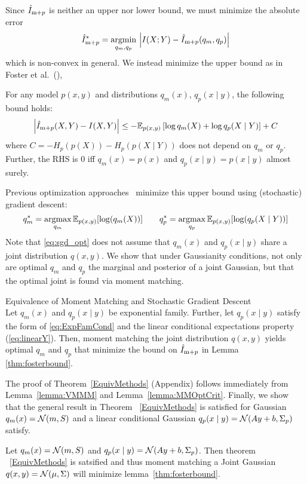 Since $\hat{I}_{\text{m}+p}$ is neither an upper nor lower bound, we must minimize the
absolute error
\begin{equation}\label{eq:mi_ml_opt}
  \hat{I}_{\text{m}+p}^* = \operatorname*{argmin}_{q_m, q_p} \, \left| I(X;Y) - \hat{I}_{\text{m}+p}(q_m, q_p) \right|
\end{equation}
which is non-convex in general.  We instead minimize the upper bound
as in Foster et al.~(\citeyear{Foster2019}),
\begin{lemma}
  \label{thm:fosterbound} For any model $p(x,y)$ and distributions
  $q_m(x)$, $q_p(x\mid y)$, the following bound holds:
  {\fontsize{9}{10}\selectfont \[\left|\hat{I}_{\text{m}+p}(X,Y)-I(X,Y)\right|\leq
  -\mathbb{E}_{p(x,y)}\left[\log q_m(X)+\log q_p(X\mid Y)\right]+C\]} where
  $C=-H_p(p(X))-H_p(p(X\mid Y))$ does not depend on $q_m$ or
  $q_p$. Further, the RHS is $0$ iff $q_m(x)=p(x)$ and $q_p(x\mid
  y)=p(x\mid y)$ almost surely.  \label{FosterBound2}
\end{lemma}
Previous optimization approaches~\cite{Foster2019} minimize this upper bound using (stochastic) gradient descent:
\begin{equation}\label{eq:sgd_opt}
  q_m^* = \operatorname*{argmax}_{q_m} \mathbb{E}_{p(x,y)}[\log(q_m(X))]\hspace{2em}  q_p^* = \operatorname*{argmax}_{q_p} \mathbb{E}_{p(x,y)}[\log(q_p(X\mid Y))]
\end{equation}
Note that \EQN\eqref{eq:sgd_opt} does not assume that $q_m(x)$ and
$q_p(x\mid y)$ share a joint distribution $q(x,y)$. We show that under
Gaussianity conditions, not only are optimal $q_m$ and $q_p$ the
marginal and posterior of a joint Gaussian, but that the optimal joint
is found via moment matching.
\begin{theorem}{Equivalence of Moment Matching and Stochastic Gradient Descent}\\
  Let $q_m(x)$ and $q_p(x\mid y)$ be exponential family.  Further, let
  $q_p(x\mid y)$ satisfy the form of \EQN\eqref{eq:ExpFamCond} and the
  linear conditional expectations property (\EQN\eqref{eq:linearY}).
  Then, moment matching the joint distribution $q(x,y)$ yields optimal
  $q_m$ and $q_p$ that minimize the bound on $\hat{I}_{\text{m}+p}$ in
  Lemma \ref{thm:fosterbound}.  \label{EquivMethods}
\end{theorem}
The proof of Theorem~\ref{EquivMethods} (Appendix) follows immediately
from Lemma~\ref{lemma:VMMM} and Lemma~\ref{lemma:MMOptCrit}.
Finally, we show that the general result in Theorem
~\ref{EquivMethods} is satisfied for Gaussian $q_m(x)=\mathcal{N}(m,S)$ and
a linear conditional Gaussian $q_p(x\mid y)=\mathcal{N}(Ay+b,\Sigma_p)$
satisfy. 
\begin{corollary}
  Let $q_m(x)=\mathcal{N}(m,S)$ and $q_p(x\mid y)=\mathcal{N}(Ay+b,\Sigma_p)$. Then theorem 
  ~\ref{EquivMethods}  is satsified and thus moment matching a Joint Gaussian 
  $q(x,y)=\mathcal{N}(\mu, \Sigma)$ will minimize lemma~\ref{thm:fosterbound}.
\end{corollary}
